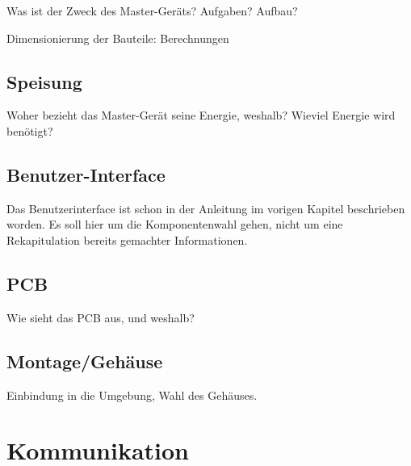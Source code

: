 Was ist der Zweck des Master-Ger\"ats? Aufgaben? Aufbau?

\anweisung Dimensionierung der Bauteile: Berechnungen


\subsection{Speisung}
\label{subsec:mastergerat:speisung}

Woher bezieht das Master-Ger\"at  seine Energie, weshalb? Wieviel Energie wird
ben\"otigt?


\subsection{Benutzer-Interface}
\label{subsec:mastergerat:interface}

\anweisung Das Benutzerinterface ist schon in der Anleitung im vorigen Kapitel
beschrieben worden. Es soll  hier um die Komponentenwahl gehen,  nicht um eine
Rekapitulation bereits gemachter Informationen.

\subsection{PCB}
\label{subsec:mastergerat:pcb}

Wie sieht das PCB aus, und weshalb?

\subsection{Montage/Geh\"ause}
\label{subsec:mastergerat:pcb}

Einbindung in die Umgebung, Wahl des Geh\"auses.


\section{Kommunikation}
\label{sec:kommunikation}

